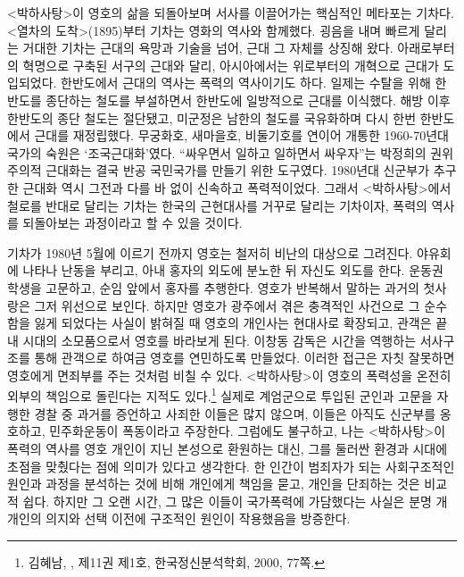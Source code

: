 <박하사탕>이 영호의 삶을 되돌아보며 서사를 이끌어가는 핵심적인 메타포는 기차다. <열차의 도착>(1895)부터 기차는 영화의 역사와 함께했다. 굉음을 내며 빠르게 달리는 거대한 기차는 근대의 욕망과 기술을 넘어, 근대 그 자체를 상징해 왔다. 아래로부터의 혁명으로 구축된 서구의 근대와 달리, 아시아에서는 위로부터의 개혁으로 근대가 도입되었다. 한반도에서 근대의 역사는 폭력의 역사이기도 하다. 일제는 수탈을 위해 한반도를 종단하는 철도를 부설하면서 한반도에 일방적으로 근대를 이식했다. 해방 이후 한반도의 종단 철도는 절단됐고, 미군정은 남한의 철도를 국유화하며 다시 한번 한반도에서 근대를 재정립했다. 무궁화호, 새마을호, 비둘기호를 연이어 개통한 1960-70년대 국가의 숙원은 `조국근대화'였다. ``싸우면서 일하고 일하면서 싸우자''는 박정희의 권위주의적 근대화는 결국 반공 국민국가를 만들기 위한 도구였다. 1980년대 신군부가 추구한 근대화 역시 그전과 다를 바 없이 신속하고 폭력적이었다. 그래서 <박하사탕>에서 철로를 반대로 달리는 기차는 한국의 근현대사를 거꾸로 달리는 기차이자, 폭력의 역사를 되돌아보는 과정이라고 할 수 있을 것이다.

기차가 1980년 5월에 이르기 전까지 영호는 철저히 비난의 대상으로 그려진다. 야유회에 나타나 난동을 부리고, 아내 홍자의 외도에 분노한 뒤 자신도 외도를 한다. 운동권 학생을 고문하고, 순임 앞에서 홍자를 추행한다. 영호가 반복해서 말하는 과거의 첫사랑은 그저 위선으로 보인다. 하지만 영호가 광주에서 겪은 충격적인 사건으로 그 순수함을 잃게 되었다는 사실이 밝혀질 때 영호의 개인사는 현대사로 확장되고, 관객은 끝내 시대의 소모품으로서 영호를 바라보게 된다. 이창동 감독은 시간을 역행하는 서사구조를 통해 관객으로 하여금 영호를 연민하도록 만들었다. 이러한 접근은 자칫 잘못하면 영호에게 면죄부를 주는 것처럼 비칠 수 있다. <박하사탕>이 영호의 폭력성을 온전히 외부의 책임으로 돌린다는 지적도 있다.\footnote{김혜남, ,  제11권 제1호, 한국정신분석학회, 2000, 77쪽.} 실제로 계엄군으로 투입된 군인과 고문을 자행한 경찰 중 과거를 증언하고 사죄한 이들은 많지 않으며, 이들은 아직도 신군부를 옹호하고, \oilpal 민주화운동이 폭동이라고 주장한다. 그럼에도 불구하고, 나는 <박하사탕>이 폭력의 역사를 영호 개인이 지닌 본성으로 환원하는 대신, 그를 둘러싼 환경과 시대에 초점을 맞췄다는 점에 의미가 있다고 생각한다. 한 인간이 범죄자가 되는 사회구조적인 원인과 과정을 분석하는 것에 비해 개인에게 책임을 묻고, 개인을 단죄하는 것은 비교적 쉽다. 하지만 그 오랜 시간, 그 많은 이들이 국가폭력에 가담했다는 사실은 분명 개개인의 의지와 선택 이전에 구조적인 원인이 작용했음을 방증한다.

